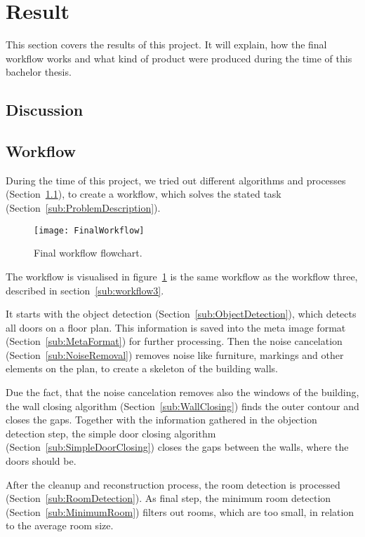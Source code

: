 \section{Result}
This section covers the results of this project. It will explain, how the final workflow works and what kind of product were produced during the time of this bachelor thesis.

\subsection{Discussion}
\label{sub:Discussion}

\subsection{Workflow}
\label{sub:FinalWorkflow}
During the time of this project, we tried out different algorithms and processes (Section~\ref{sub:Discussion}), to create a workflow, which solves the stated task (Section~\ref{sub:ProblemDescription}).

\begin{figure}[H]
	\centering
	\texttt{[image: FinalWorkflow]}
	\caption{Final workflow flowchart.}
	\label{fig:FinalWorkflow}
\end{figure}

The workflow is visualised in figure~\ref{fig:FinalWorkflow} is the same workflow as the workflow three, described in section~\ref{sub:workflow3}.

It starts with the object detection (Section~\ref{sub:ObjectDetection}), which detects all doors on a floor plan. This information is saved into the meta image format (Section~\ref{sub:MetaFormat}) for further processing. Then the noise cancelation (Section~\ref{sub:NoiseRemoval}) removes noise like furniture, markings and other elements on the plan, to create a skeleton of the building walls.

Due the fact, that the noise cancelation removes also the windows of the building, the wall closing algorithm (Section~\ref{sub:WallClosing}) finds the outer contour and closes the gaps. Together with the information gathered in the objection detection step, the simple door closing algorithm (Section~\ref{sub:SimpleDoorClosing}) closes the gaps between the walls, where the doors should be.

After the cleanup and reconstruction process, the room detection is processed (Section~\ref{sub:RoomDetection}). As final step, the minimum room detection (Section~\ref{sub:MinimumRoom}) filters out rooms, which are too small, in relation to the average room size.


